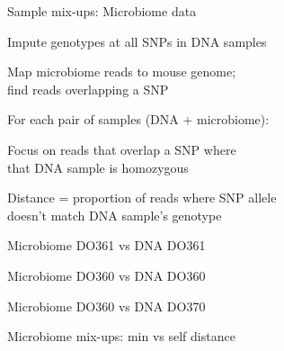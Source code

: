 \documentclass[aspectratio=169,12pt,t]{beamer}
\begin{document}
\begin{frame}{Sample mix-ups: Microbiome data}

\bbi
\item Impute genotypes at all SNPs in DNA samples

\item Map microbiome reads to mouse genome;\\ find reads overlapping a SNP

\item For each pair of samples (DNA + microbiome):

  \bi
  \itemsep10pt
  \item Focus on reads that overlap a SNP where \\
        that DNA sample is homozygous

  \item Distance = proportion of reads where SNP allele \\
    \hspace*{16mm} doesn't match DNA sample's genotype
  \ei
\ei

\note{
}
\end{frame}



\begin{frame}[c]{Microbiome DO361 vs DNA DO361}

  \centering
  \LARGE


\note{
}
\end{frame}


\begin{frame}[c]{Microbiome DO360 vs DNA DO360}

  \centering
  \LARGE


\note{
}
\end{frame}


\begin{frame}[c]{Microbiome DO360 vs DNA DO370}

  \centering
  \LARGE


\note{
}
\end{frame}


\begin{frame}[c]{Microbiome mix-ups: min vs self distance}


\note{
}
\end{frame}
\end{document}

